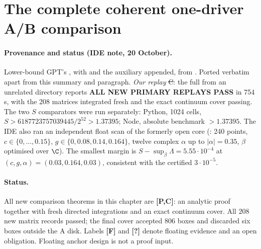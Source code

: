 \section{The complete coherent one-driver A/B comparison}
\label{ch:complete-coherent-driver}

\paragraph{Provenance and status (IDE note, 20 October).} Lower-bound GPT's , with  and the auxiliary
 appended, from . Ported verbatim apart from this summary and paragraph. \emph{Our replay} \st{C}: the full
 from an unrelated directory reports \textbf{ALL NEW PRIMARY REPLAYS PASS} in 754\,s, with the 208 matrices integrated fresh and the exact continuum cover passing. The two
$S$ comparators were run separately: Python, 1024 cells, $S>6187723757039445/2^{52}>1.37395$; Node, absolute benchmark $>1.37395$. The IDE also ran an independent float scan of the
formerly open core (: 240 points, $c\in\{0,\dots,0.15\}$, $g\in\{0,0.08,0.14,0.164\}$, twelve complex $\alpha$ up to $|\alpha|=0.35$, $\beta$ optimised over $\C$). The smallest margin is $S-\sup_\beta\Lambda=5.55\cdot10^{-4}$ at $(c,g,\alpha)=(0.03,0.164,0.03)$, consistent with the certified $3\cdot10^{-5}$.


\paragraph{Status.}
All new comparison theorems in this chapter are \textbf{[P,C]}:
an analytic proof together with fresh directed integrations and an exact
continuum cover. All $208$ new matrix records passed; the final cover
accepted $806$ boxes and discarded six boxes outside the A disk.
Labels \textbf{[F]} and \textbf{[?]} denote floating evidence and an
open obligation. Floating anchor design is not a proof input.

